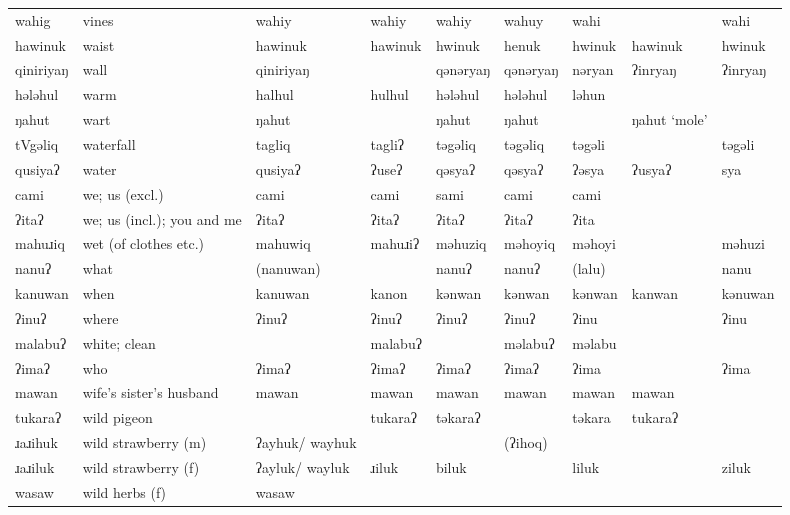 \begin{landscape}
\begin{longtable}{*{9}{>{\raggedright\arraybackslash}p{}}}
\text{*}wahig        & vines & wahiy & wahiy & wahiy & wahuy & wahi &  & wahi\\
\text{*}hawinuk      & waist & hawinuk & hawinuk & hwinuk & henuk & hwinuk & hawinuk & hwinuk\\
\text{*}qiniriyaŋ    & wall & qiniriyaŋ &  & qənəryaŋ & qənəryaŋ & nəryan & ʔinryaŋ & ʔinryaŋ\\
\text{*}hələhul      & warm & halhul & hulhul & hələhul & hələhul & ləhun &  & \\
\text{*}ŋahut        & wart & ŋahut &  & ŋahut & ŋahut &  & ŋahut `mole' & \\
\text{*}tVgəliq      & waterfall & tagliq & tagliʔ & təgəliq & təgəliq & təgəli &  & təgəli\\
\text{*}qusiyaʔ      & water & qusiyaʔ & ʔuseʔ & qəsyaʔ & qəsyaʔ & ʔəsya & ʔusyaʔ & sya\\
\text{*}cami         & we; us (excl.) & cami & cami & sami & cami & cami &  & \\
\text{*}ʔitaʔ        & we; us (incl.); you and me & ʔitaʔ & ʔitaʔ & ʔitaʔ & ʔitaʔ & ʔita &  & \\
\text{*}mahuɹiq      & wet (of clothes etc.) & mahuwiq & mahuɹiʔ & məhuziq & məhoyiq & məhoyi &  & məhuzi\\
\text{*}nanuʔ        & what & (nanuwan) &  & nanuʔ & nanuʔ & (lalu) &  & nanu\\
\text{*}kanuwan      & when & kanuwan & kanon & kənwan & kənwan & kənwan & kanwan & kənuwan\\
\text{*}ʔinuʔ        & where & ʔinuʔ & ʔinuʔ & ʔinuʔ & ʔinuʔ & ʔinu &  & ʔinu\\
\text{*}malabuʔ      & white; clean &  & malabuʔ &  & məlabuʔ & məlabu &  & \\
\text{*}ʔimaʔ        & who & ʔimaʔ & ʔimaʔ & ʔimaʔ & ʔimaʔ & ʔima &  & ʔima\\
\text{*}mawan        & wife's sister's husband & mawan & mawan & mawan & mawan & mawan & mawan & \\
\text{*}tukaraʔ      & wild pigeon &  & tukaraʔ & təkaraʔ &  & təkara & tukaraʔ & \\
\text{*}ɹaɹihuk      & wild strawberry (m) & ʔayhuk/ \newline wayhuk &  &  & (ʔihoq) &  &  & \\
\text{*}ɹaɹiluk      & wild strawberry (f) & ʔayluk/ \newline wayluk & ɹiluk & biluk &  & liluk &  & ziluk\\
\text{*}wasaw        & wild herbs (f) & wasaw &  &  &  &  &  & \\

\end{longtable}
\end{landscape}
